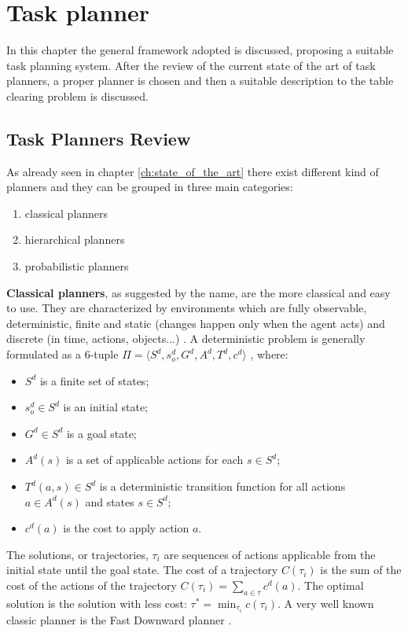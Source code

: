 \chapter{Task planner}
\label{ch:task_planner}
In this chapter the general framework adopted is discussed, proposing a suitable task planning system. After the  review of the current state of the art of task planners, a proper planner is chosen and then a suitable description to the table clearing problem is discussed.
\section{Task Planners Review}
As already seen in chapter \ref{ch:state_of_the_art} there exist different kind of planners and they can be grouped in three main categories:
\begin{enumerate}
\item classical planners
\item hierarchical planners
\item probabilistic planners
\end{enumerate}
\textbf{Classical planners}, as suggested by the name, are the more classical and easy to use. They are characterized by environments which are fully observable, deterministic, finite and static (changes happen only when the agent acts) and discrete (in time, actions, objects...) \citep{artificialIntelligence}.
A deterministic problem is generally formulated as a $6$-tuple $\Pi=\langle S^d, s_o^d, G^d, A^d, T^d, c^d \rangle$ \cite{little2007probabilistic}, where:
\begin{itemize}
\item $S^d$ is a finite set of states;
\item $s_o^d \in S^d$ is an initial state;
\item $G^d \in S^d$ is a goal state;
\item $A^d(s)$ is a set of applicable actions for each $s \in S^d$;
\item $T^d(a,s) \in S^d$ is a deterministic transition function for all actions $a \in A^d(s)$ and states $ s \in S^d$;
\item $c^d(a)$ is the cost to apply action $a$. 
\end{itemize}
The solutions, or trajectories, $\tau_i$ are sequences of actions applicable from the initial state until the goal state. The cost of a trajectory $C(\tau_i)$ is the sum of the cost of the actions of the trajectory $C(\tau_i) = \sum_{a \in \tau} c^d(a)$. The optimal solution is the solution with less cost: $\tau^* = \min_{\tau_i} c(\tau_i)$. A very well known classic planner is the Fast Downward planner \cite{helmert2006fast}.

